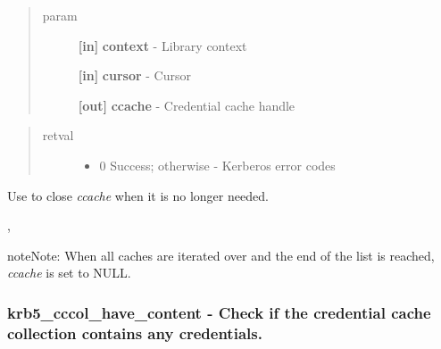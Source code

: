 \documentclass[letterpaper,10pt,english]{sphinxmanual}
\begin{document}
\begin{quote}\begin{description}
\item[{param}] \leavevmode
\textbf{{[}in{]}} \textbf{context} - Library context

\textbf{{[}in{]}} \textbf{cursor} - Cursor

\textbf{{[}out{]}} \textbf{ccache} - Credential cache handle

\end{description}\end{quote}
\begin{quote}\begin{description}
\item[{retval}] \leavevmode\begin{itemize}
\item {} 
0   Success; otherwise - Kerberos error codes

\end{itemize}

\end{description}\end{quote}

Use {\hyperref[appdev/refs/api/krb5_cc_close:krb5_cc_close]{}} to close \emph{ccache} when it is no longer needed.




{\hyperref[appdev/refs/api/krb5_cccol_cursor_new:krb5_cccol_cursor_new]{}} , {\hyperref[appdev/refs/api/krb5_cccol_cursor_free:krb5_cccol_cursor_free]{}}



\begin{notice}{note}{Note:}
When all caches are iterated over and the end of the list is reached, \emph{ccache} is set to NULL.
\end{notice}


\subsubsection{krb5\_cccol\_have\_content -  Check if the credential cache collection contains any credentials.}
\label{appdev/refs/api/krb5_cccol_have_content:krb5-cccol-have-content-check-if-the-credential-cache-collection-contains-any-credentials}\label{appdev/refs/api/krb5_cccol_have_content::doc}

\begin{fulllineitems}
\label{appdev/refs/api/krb5_cccol_have_content:krb5_cccol_have_content}
\end{fulllineitems}
\end{document}
